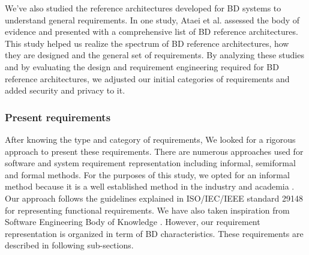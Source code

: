 \documentclass{bmcart}
\begin{document}

We've also studied the reference architectures developed for BD systems to understand general requirements. In one study, Ataei et al. \cite{ataei2020big} assessed the body of evidence and presented with a comprehensive list of BD reference architectures. This study helped us realize the spectrum of BD reference architectures, how they are designed and the general set of requirements. By analyzing these studies and by evaluating the design and requirement engineering required for BD reference architectures, we adjusted our initial categories of requirements and added security and privacy to it. 

\subsubsection{Present requirements}
After knowing the type and category of requirements, We looked for a rigorous approach to present these requirements. There are numerous approaches used for software and system requirement representation including informal, semiformal and formal methods. For the purposes of this study, we opted for an informal method because it is a well established method in the industry and academia \cite{kassab2014state}. Our approach follows the guidelines explained in ISO/IEC/IEEE standard 29148 \cite{ISO29148} for representing functional requirements. We have also taken inspiration from Software Engineering Body of Knowledge \cite{abran2004software}. However, our requirement representation is organized in term of BD characteristics. These requirements are described in following sub-sections.




\end{document}
